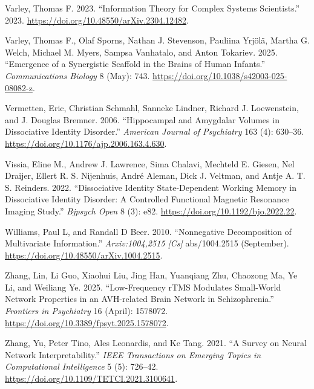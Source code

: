 \documentclass[
  a4paper]{article}
\newlength{\cslhangindent}
\newenvironment{CSLReferences}[2] %
 {\begin{list}{}{%
  \setlength{\itemindent}{0pt}
  \setlength{\leftmargin}{0pt}
  \setlength{\parsep}{0pt}
  \ifodd #1
   \setlength{\leftmargin}{\cslhangindent}
   \setlength{\itemindent}{-1\cslhangindent}
  \fi
  \setlength{\itemsep}{#2\baselineskip}}}
 {\end{list}}
\begin{document}
\begin{CSLReferences}{1}{0}
Varley, Thomas F. 2023. {``Information Theory for Complex Systems
Scientists.''} 2023. \url{https://doi.org/10.48550/arXiv.2304.12482}.

Varley, Thomas F., Olaf Sporns, Nathan J. Stevenson, Pauliina Yrjölä,
Martha G. Welch, Michael M. Myers, Sampsa Vanhatalo, and Anton Tokariev.
2025. {``Emergence of a Synergistic Scaffold in the Brains of Human
Infants.''} \emph{Communications Biology} 8 (May): 743.
\url{https://doi.org/10.1038/s42003-025-08082-z}.

Vermetten, Eric, Christian Schmahl, Sanneke Lindner, Richard J.
Loewenstein, and J. Douglas Bremner. 2006. {``Hippocampal and Amygdalar
Volumes in Dissociative Identity Disorder.''} \emph{American Journal of
Psychiatry} 163 (4): 630--36.
\url{https://doi.org/10.1176/ajp.2006.163.4.630}.

Vissia, Eline M., Andrew J. Lawrence, Sima Chalavi, Mechteld E. Giesen,
Nel Draijer, Ellert R. S. Nijenhuis, André Aleman, Dick J. Veltman, and
Antje A. T. S. Reinders. 2022. {``Dissociative Identity State-Dependent
Working Memory in Dissociative Identity Disorder: A Controlled
Functional Magnetic Resonance Imaging Study.''} \emph{Bjpsych Open} 8
(3): e82. \url{https://doi.org/10.1192/bjo.2022.22}.

Williams, Paul L, and Randall D Beer. 2010. {``Nonnegative Decomposition
of Multivariate Information.''} \emph{Arxiv:1004,2515 {[}Cs{]}}
abs/1004.2515 (September).
\url{https://doi.org/10.48550/arXiv.1004.2515}.

Zhang, Lin, Li Guo, Xiaohui Liu, Jing Han, Yuanqiang Zhu, Chaozong Ma,
Ye Li, and Weiliang Ye. 2025. {``Low-Frequency {rTMS} Modulates
Small-World Network Properties in an {AVH-related} Brain Network in
Schizophrenia.''} \emph{Frontiers in Psychiatry} 16 (April): 1578072.
\url{https://doi.org/10.3389/fpsyt.2025.1578072}.

Zhang, Yu, Peter Tino, Ales Leonardis, and Ke Tang. 2021. {``A Survey on
Neural Network Interpretability.''} \emph{IEEE Transactions on Emerging
Topics in Computational Intelligence} 5 (5): 726--42.
\url{https://doi.org/10.1109/TETCI.2021.3100641}.

\end{CSLReferences}
\end{document}
